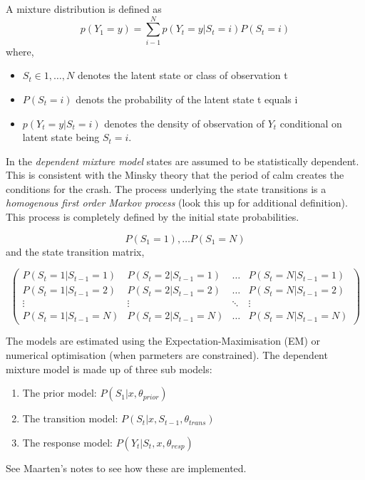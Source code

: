 \documentclass[12pt, a4paper, oneside]{article} %
\begin{document}
A mixture distribution is defined as 
\begin{equation}
p(Y_1 = y) = \sum_{i - 1}^N p(Y_t = y|S_t = i)P(S_t = i)
\end{equation}
where,
\begin{itemize}
\item $S_t \in {1, \dots, N}$ denotes the latent state or class of observation t
\item $P(S_t = i)$ denots the probability of the latent state t equals i 
\item $p(Y_t = y|S_t = i)$ denotes the density of observation of $Y_t$ conditional on latent state being $S_t = i$.
\end{itemize}

In the \emph{dependent mixture model} states are assumed to be statistically dependent.  This is consistent with the Minsky theory that the period of calm creates the conditions for the crash. The process underlying the state transitions is a \emph{homogenous first order Markov process}  (look this up for additional definition).  This process is completely defined by the initial state probabilities.  

\begin{equation*}
P(S_1 = 1), \dots P(S_1 = N)
\end{equation*}
and the state transition matrix, 

\begin{equation*}
\begin{pmatrix}
P(S_t = 1|S_{t-1}=1) & P(S_t = 2|S_{t-1}=1) & \dots & P(S_t = N|S_{t-1}=1)\\
P(S_t = 1|S_{t-1}=2) & P(S_t = 2|S_{t-1}=2) & \dots & P(S_t = N|S_{t-1}=2)\\
\vdots & \vdots & \ddots & \vdots \\
P(S_t = 1|S_{t-1}=N) & P(S_t = 2|S_{t-1}=N) & \dots & P(S_t = N|S_{t-1}=N)
\end{pmatrix}
\end{equation*}

The models are estimated using the Expectation-Maximisation (EM) or numerical optimisation (when parmeters are constrained).  The dependent mixture model is made up of three sub models:  
\begin{enumerate}
\item The prior model: $P(S_1|x, \theta_{prior})$
\item The transition model: $P(S_t|x, S_{t-1}, \theta_{trans})$
\item The response model: $P(Y_t| S_t, x, \theta_{resp})$
\end{enumerate}
 See Maarten's notes to see how these are implemented.  
 
\end{document}
